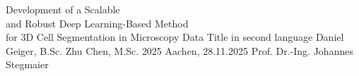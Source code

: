 \documentclass[12pt,a4paper,titlepage,twoside,numbers=noenddot,BCOR=12mm]{scrreprt}
\begin{document}

\pagestyle{scrheadings}
\renewcommand{\chaptermark}[1]{\markboth{#1}{#1}}
\renewcommand{\sectionmark}[1]{\markright{\thesection\ \ #1}}

%
%

\addtolength{\topmargin}{0.5cm}
\addtolength{\textwidth}{5cm}
\pagestyle{empty}
             {Development of a Scalable\\		
			and Robust Deep Learning-Based Method		\\	  			
			for 3D Cell Segmentation in Microscopy Data	}     %
             {Title in second language}      %
             {Daniel Geiger, B.Sc.}                     %
             {Zhu Chen, M.Sc.}          %
             {2025}                                  %
             {Aachen, 28.11.2025} 	%
             {Prof. Dr.-Ing. Johannes Stegmaier} %

\addtolength{\textwidth}{-5cm}
\cleardoublepage


%
%

\pagestyle{plain}
\tableofcontents
\cleardoublepage


\pagestyle{empty}
\begingroup
\let\cleardoublepage\relax
\let\clearpage\relax
{}
\listoffigures
{}
\listoftables
\endgroup
\cleardoublepage





\pagestyle{scrheadings}
\renewcommand{\chaptermark}[1]{\markboth{\thechapter\ #1}{}}
\renewcommand{\sectionmark}[1]{\markright{\thesection\ #1}{}}
\end{document}
